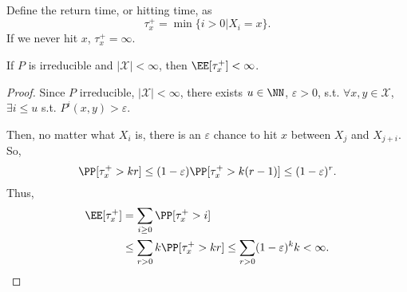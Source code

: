 \begin{definition}

Define the \ac{return time}, or \ac{hitting time}, as
\[\tau_x^+ = \min\{i>0|X_i=x\}.\]
If we never hit $x$, $\tau_x^+=\infty$. 
\end{definition}

\begin{theorem}
\proplabel

If $P$ is irreducible and $\vert \mathcal{X}\vert < \infty$, then $\EE[\tau_x^+] < \infty$. 
\end{theorem}

\begin{proof}
Since $P$ irreducible, $\vert \mathcal{X}\vert < \infty$, there exists $u\in \NN$, $\varepsilon>0$, s.t. $\forall x,y\in \mathcal{X}$, $\exists i\leq u$ s.t. $P^i(x,y)>\varepsilon$. 

Then, no matter what $X_i$ is, there is an $\varepsilon$ chance to hit $x$ between $X_j$ and $X_{j+i}$. So, 
\[\PP[\tau_x^+ > kr] \leq (1-\varepsilon)\PP[\tau_x^+>k(r-1)] \leq (1-\varepsilon)^r.\]
Thus,
\begin{align*}
    \EE[\tau_x^+] &= \sum_{i\geq 0}\PP[\tau_x^+>i] \\
    &\leq \sum_{r>0}k\PP[\tau_x^+ > kr] \leq \sum_{r>0}(1-\varepsilon)^kk<\infty.
\end{align*}
\end{proof}

